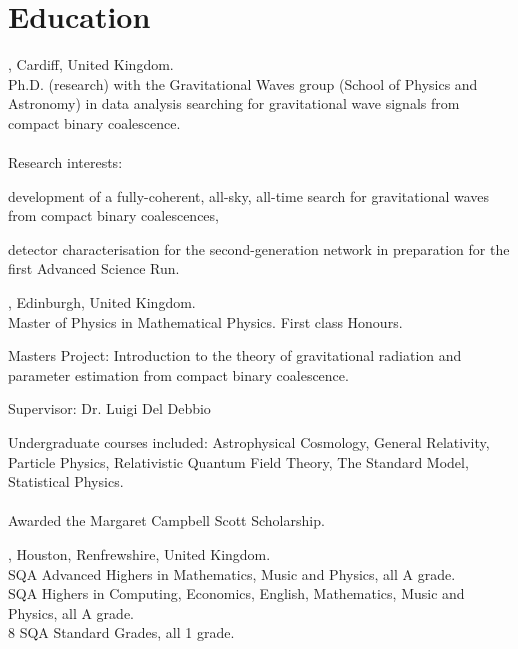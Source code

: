 \section{Education}
, Cardiff, United Kingdom.\\
Ph.D. (research) with the Gravitational Waves group (School of Physics and Astronomy) in data analysis searching for gravitational wave signals from compact binary coalescence.\\\\
Research interests:
\begin{closeitem}
\item development of a fully-coherent, all-sky, all-time search for gravitational waves from compact binary coalescences,
\item detector characterisation for the second-generation network in preparation for the first Advanced Science Run.
\end{closeitem}

, Edinburgh, United Kingdom.\\
Master of Physics in Mathematical Physics. First class Honours.
\begin{closeitem}
\item Masters Project: Introduction to the theory of gravitational radiation and parameter estimation from compact binary coalescence.
\item Supervisor: Dr. Luigi Del Debbio
\end{closeitem}
Undergraduate courses included: Astrophysical Cosmology, General Relativity, Particle Physics, Relativistic Quantum Field Theory, The Standard Model, Statistical Physics.\\\\
Awarded the Margaret Campbell Scott Scholarship.

, Houston, Renfrewshire, United Kingdom.\\
SQA Advanced Highers in Mathematics, Music and Physics, all A grade.\\
SQA Highers in Computing, Economics, English, Mathematics, Music and Physics, all A grade.\\
8 SQA Standard Grades, all 1 grade. 

